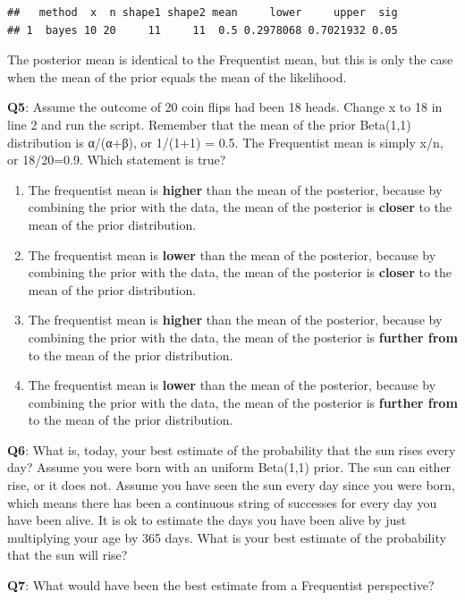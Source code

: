 \documentclass[
  oneside]{book}
\providecommand{\tightlist}{%
  \setlength{\itemsep}{0pt}\setlength{\parskip}{0pt}}
\begin{document}
\begin{verbatim}
##   method  x  n shape1 shape2 mean     lower     upper  sig
## 1  bayes 10 20     11     11  0.5 0.2978068 0.7021932 0.05
\end{verbatim}

The posterior mean is identical to the Frequentist mean, but this is only the case when the mean of the prior equals the mean of the likelihood.

\textbf{Q5}: Assume the outcome of 20 coin flips had been 18 heads. Change x to 18 in line 2 and run the script. Remember that the mean of the prior Beta(1,1) distribution is α/(α+β), or 1/(1+1) = 0.5. The Frequentist mean is simply x/n, or 18/20=0.9. Which statement is true?

\begin{enumerate}
\def\labelenumi{\Alph{enumi})}
\tightlist
\item
  The frequentist mean is \textbf{higher} than the mean of the posterior, because by combining the prior with the data, the mean of the posterior is \textbf{closer} to the mean of the prior distribution.
\item
  The frequentist mean is \textbf{lower} than the mean of the posterior, because by combining the prior with the data, the mean of the posterior is \textbf{closer} to the mean of the prior distribution.
\item
  The frequentist mean is \textbf{higher} than the mean of the posterior, because by combining the prior with the data, the mean of the posterior is \textbf{further from} to the mean of the prior distribution.
\item
  The frequentist mean is \textbf{lower} than the mean of the posterior, because by combining the prior with the data, the mean of the posterior is \textbf{further from} to the mean of the prior distribution.
\end{enumerate}

\textbf{Q6}: What is, today, your best estimate of the probability that the sun rises every day? Assume you were born with an uniform Beta(1,1) prior. The sun can either rise, or it does not. Assume you have seen the sun every day since you were born, which means there has been a continuous string of successes for every day you have been alive. It is ok to estimate the days you have been alive by just multiplying your age by 365 days. What is your best estimate of the probability that the sun will rise?

\textbf{Q7}: What would have been the best estimate from a Frequentist perspective?
\end{document}
